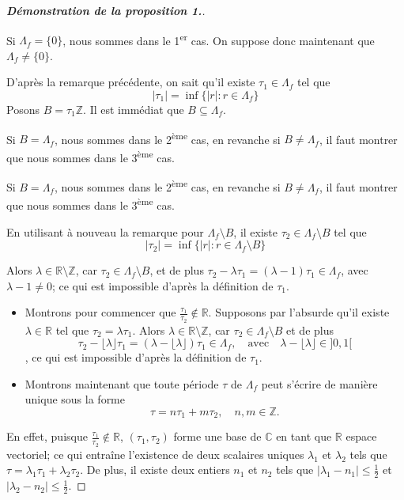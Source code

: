 \documentclass[12pt]{article}
\begin{document}
\begin{proof}[\textbf{Démonstration de la proposition 1.}] \

Si \( \Lambda_f = \{0\} \), nous sommes dans le 1\textsuperscript{er} cas. On suppose donc maintenant que \( \Lambda_f \neq \{0\} \).

D'après la remarque précédente, on sait qu'il existe \( \tau_1 \in \Lambda_f \) tel que
\[
|\tau_1| = \inf\{|r| : r \in \Lambda_f\}
\]
Posons \( B = \tau_1\mathbb{Z} \). Il est immédiat que \( B \subseteq \Lambda_f \).

Si \( B = \Lambda_f \), nous sommes dans le 2\textsuperscript{ème} cas, en revanche si \( B \neq \Lambda_f \), il faut montrer que nous sommes dans le 3\textsuperscript{ème} cas.

Si \( B = \Lambda_f \), nous sommes dans le 2\textsuperscript{ème} cas, en revanche si \( B \neq \Lambda_f \), il faut montrer que nous sommes dans le 3\textsuperscript{ème} cas.

En utilisant à nouveau la remarque pour \( \Lambda_f \setminus B  \), il existe \( \tau_2 \in \Lambda_f \setminus B  \) tel que
\[
|\tau_2| = \inf\{|r| : r \in \Lambda_f \setminus B \}
\]

Alors \( \lambda \in \mathbb{R}\setminus\mathbb{Z} \), car \( \tau_2 \in \Lambda_f \setminus B  \), et de plus \( \tau_2 - \lambda\tau_1 = (\lambda - 1)\tau_1 \in \Lambda_f \), avec \( \lambda - 1 \neq 0 \); ce qui est impossible d'après la définition de \( \tau_1 \).
\begin{itemize}
    \item Montrons pour commencer que \( \frac{\tau_1}{\tau_2} \notin \mathbb{R} \). Supposons par l'absurde qu'il existe \( \lambda \in \mathbb{R} \) tel que \( \tau_2 = \lambda\tau_1 \).
    Alors \( \lambda \in \mathbb{R} \setminus \mathbb{Z} \), car \( \tau_2 \in \Lambda_f \setminus B \) et de plus  \[
    \tau_2 - \lfloor \lambda \rfloor \tau_1 = (\lambda - \lfloor \lambda \rfloor) \tau_1 \in \Lambda_f, \quad \text{avec} \quad \lambda - \lfloor \lambda \rfloor \in ]0, 1[
        \], ce qui est impossible d’après la définition de \( \tau_1 \).
    \item Montrons maintenant que toute période \( \tau \) de \( \Lambda_f \) peut s'écrire de manière unique sous la forme
    \[
        \tau = n\tau_1 + m\tau_2, \quad n, m \in \mathbb{Z}.
        \]
    \end{itemize}

    En effet, puisque \(\frac{\tau_1}{\tau_2} \notin \mathbb{R}\), \((\tau_1, \tau_2)\) forme une base de \(\mathbb{C}\) en tant que \(\mathbb{R}\) espace vectoriel; ce qui entraîne l’existence de deux scalaires uniques \(\lambda_1\) et \(\lambda_2\) tels que \(\tau = \lambda_1 \tau_1 + \lambda_2 \tau_2\). De plus, il existe deux entiers \(n_1\) et \(n_2\) tels que \(|\lambda_1 - n_1| \leq \frac{1}{2}\) et \(|\lambda_2 - n_2| \leq \frac{1}{2}\).


\end{proof}
\end{document}
